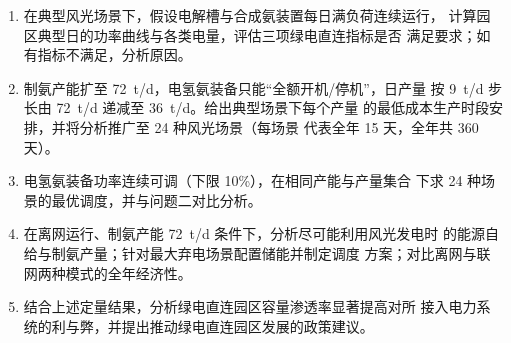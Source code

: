 \begin{enumerate}[label=问题~\arabic*.,leftmargin=3.2em]
  \item 在典型风光场景下，假设电解槽与合成氨装置每日满负荷连续运行，
        计算园区典型日的功率曲线与各类电量，评估三项绿电直连指标是否
        满足要求；如有指标不满足，分析原因。
  \item 制氨产能扩至 72~t/d，电氢氨装备只能``全额开机/停机''，日产量
        按 9~t/d 步长由 72~t/d 递减至 36~t/d。给出典型场景下每个产量
        的最低成本生产时段安排，并将分析推广至 24 种风光场景（每场景
        代表全年 15 天，全年共 360 天）。
  \item 电氢氨装备功率连续可调（下限 10\%），在相同产能与产量集合
        下求 24 种场景的最优调度，并与问题二对比分析。
  \item 在离网运行、制氨产能 72~t/d 条件下，分析尽可能利用风光发电时
        的能源自给与制氨产量；针对最大弃电场景配置储能并制定调度
        方案；对比离网与联网两种模式的全年经济性。
  \item 结合上述定量结果，分析绿电直连园区容量渗透率显著提高对所
        接入电力系统的利与弊，并提出推动绿电直连园区发展的政策建议。
\end{enumerate}
